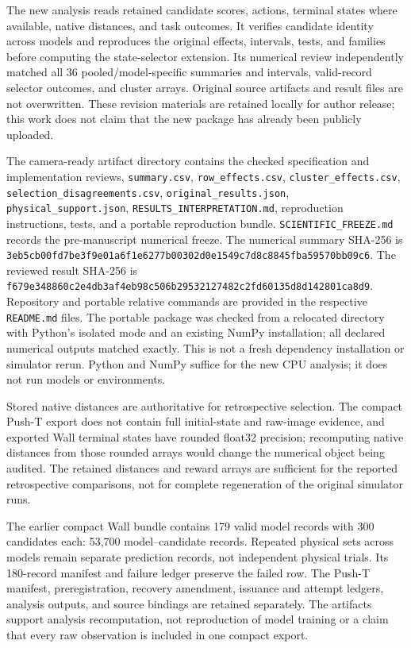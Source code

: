 The new analysis reads retained candidate scores, actions, terminal states
where available, native distances, and task outcomes. It verifies candidate
identity across models and reproduces the original effects, intervals, tests,
and families before computing the state-selector extension. Its numerical
review independently matched all 36 pooled/model-specific summaries and
intervals, valid-record selector outcomes, and cluster arrays. Original source
artifacts and result files are not overwritten.
These revision materials are retained locally for author release; this work
does not claim that the new package has already been publicly uploaded.

The camera-ready artifact directory
 contains the checked specification
and implementation reviews, \texttt{summary.csv}, \texttt{row\_effects.csv},
\texttt{cluster\_effects.csv}, \texttt{selection\_disagreements.csv},
\texttt{original\_results.json}, \texttt{physical\_support.json},
\texttt{RESULTS\_INTERPRETATION.md}, reproduction instructions, tests, and a
portable reproduction bundle. \texttt{SCIENTIFIC\_FREEZE.md} records the
pre-manuscript numerical freeze. The numerical summary SHA-256 is
\texttt{3eb5cb00fd7be3f9e01a6f1e6277b003}\allowbreak\texttt{02d0e1549c7d8c8845fba59570bb09c6}.
The reviewed result SHA-256 is
\texttt{f679e348860c2e4db3af4eb98c506b29}\allowbreak\texttt{532127482c2fd60135d8d142801ca8d9}.
Repository and portable relative commands are provided in the respective
\texttt{README.md} files. The portable package was checked from a relocated
directory with Python's isolated mode and an existing NumPy installation;
all declared numerical outputs matched exactly. This is not a fresh dependency
installation or simulator rerun. Python and NumPy suffice for the new CPU analysis;
it does not run models or environments.

Stored native distances are authoritative for retrospective selection.
The compact Push-T export does not contain full initial-state and raw-image
evidence, and exported Wall terminal states have rounded float32 precision;
recomputing native distances from those rounded arrays would change the
numerical object being audited. The retained distances and reward arrays
are sufficient for the reported retrospective comparisons, not for complete
regeneration of the original simulator runs.

The earlier compact Wall bundle contains 179 valid model records with 300
candidates each: 53,700 model--candidate records. Repeated physical sets
across models remain separate prediction records, not independent physical
trials. Its 180-record manifest and failure ledger preserve the failed row.
The Push-T manifest, preregistration, recovery amendment, issuance and attempt
ledgers, analysis outputs, and source bindings are retained separately. The
artifacts support analysis recomputation, not reproduction of model training
or a claim that every raw observation is included in one compact export.


